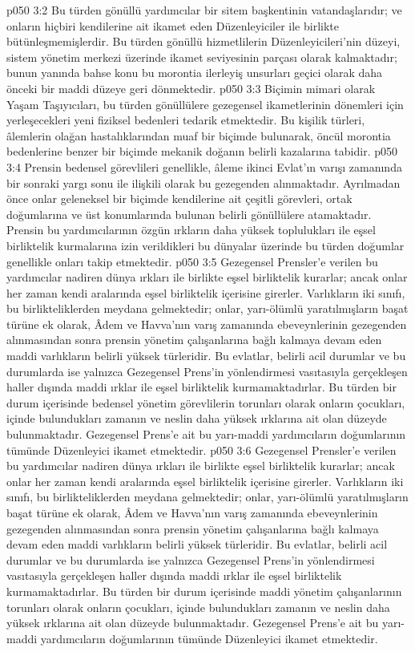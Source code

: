 \vs p050 3:2 Bu türden gönüllü yardımcılar bir sitem başkentinin vatandaşlarıdır; ve onların hiçbiri kendilerine ait ikamet eden Düzenleyiciler ile birlikte bütünleşmemişlerdir. Bu türden gönüllü hizmetlilerin Düzenleyicileri’nin düzeyi, sistem yönetim merkezi üzerinde ikamet seviyesinin parçası olarak kalmaktadır; bunun yanında bahse konu bu morontia ilerleyiş unsurları geçici olarak daha önceki bir maddi düzeye geri dönmektedir.
\vs p050 3:3 Biçimin mimari olarak Yaşam Taşıyıcıları, bu türden gönüllülere gezegensel ikametlerinin dönemleri için yerleşecekleri yeni fiziksel bedenleri tedarik etmektedir. Bu kişilik türleri, âlemlerin olağan hastalıklarından muaf bir biçimde bulunarak, öncül morontia bedenlerine benzer bir biçimde mekanik doğanın belirli kazalarına tabidir.
\vs p050 3:4 Prensin bedensel görevlileri genellikle, âleme ikinci Evlat’ın varışı zamanında bir sonraki yargı sonu ile ilişkili olarak bu gezegenden alınmaktadır. Ayrılmadan önce onlar geleneksel bir biçimde kendilerine ait çeşitli görevleri, ortak doğumlarına ve üst konumlarında bulunan belirli gönüllülere atamaktadır. Prensin bu yardımcılarının özgün ırkların daha yüksek toplulukları ile eşsel birliktelik kurmalarına izin verildikleri bu dünyalar üzerinde bu türden doğumlar genellikle onları takip etmektedir.
\vs p050 3:5 Gezegensel Prensler’e verilen bu yardımcılar nadiren dünya ırkları ile birlikte eşsel birliktelik kurarlar; ancak onlar her zaman kendi aralarında eşsel birliktelik içerisine girerler. Varlıkların iki sınıfı, bu birlikteliklerden meydana gelmektedir; onlar, yarı\hyp{}ölümlü yaratılmışların başat türüne ek olarak, Âdem ve Havva’nın varış zamanında ebeveynlerinin gezegenden alınmasından sonra prensin yönetim çalışanlarına bağlı kalmaya devam eden maddi varlıkların belirli yüksek türleridir. Bu evlatlar, belirli acil durumlar ve bu durumlarda ise yalnızca Gezegensel Prens’in yönlendirmesi vasıtasıyla gerçekleşen haller dışında maddi ırklar ile eşsel birliktelik kurmamaktadırlar. Bu türden bir durum içerisinde bedensel yönetim görevlilerin torunları olarak onların çocukları, içinde bulundukları zamanın ve neslin daha yüksek ırklarına ait olan düzeyde bulunmaktadır. Gezegensel Prens’e ait bu yarı\hyp{}maddi yardımcıların doğumlarının tümünde Düzenleyici ikamet etmektedir.
\vs p050 3:6 Gezegensel Prensler’e verilen bu yardımcılar nadiren dünya ırkları ile birlikte eşsel birliktelik kurarlar; ancak onlar her zaman kendi aralarında eşsel birliktelik içerisine girerler. Varlıkların iki sınıfı, bu birlikteliklerden meydana gelmektedir; onlar, yarı\hyp{}ölümlü yaratılmışların başat türüne ek olarak, Âdem ve Havva’nın varış zamanında ebeveynlerinin gezegenden alınmasından sonra prensin yönetim çalışanlarına bağlı kalmaya devam eden maddi varlıkların belirli yüksek türleridir. Bu evlatlar, belirli acil durumlar ve bu durumlarda ise yalnızca Gezegensel Prens’in yönlendirmesi vasıtasıyla gerçekleşen haller dışında maddi ırklar ile eşsel birliktelik kurmamaktadırlar. Bu türden bir durum içerisinde maddi yönetim çalışanlarının torunları olarak onların çocukları, içinde bulundukları zamanın ve neslin daha yüksek ırklarına ait olan düzeyde bulunmaktadır. Gezegensel Prens’e ait bu yarı\hyp{}maddi yardımcıların doğumlarının tümünde Düzenleyici ikamet etmektedir.
